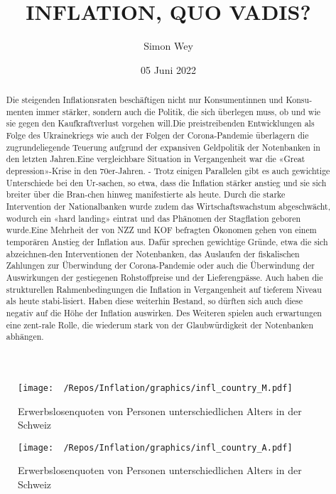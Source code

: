 \documentclass[
]{article}
\title{INFLATION, QUO VADIS?}
\author{Simon Wey}
\date{05 Juni 2022}
\begin{document}
\maketitle
\begin{abstract}
Die steigenden Inflationsraten beschäftigen nicht nur Konsumentinnen und
Konsu-menten immer stärker, sondern auch die Politik, die sich überlegen
muss, ob und wie sie gegen den Kaufkraftverlust vorgehen will.Die
preistreibenden Entwicklungen als Folge des Ukrainekriegs wie auch der
Folgen der Corona-Pandemie überlagern die zugrundeliegende Teuerung
aufgrund der expansiven Geldpolitik der Notenbanken in den letzten
Jahren.Eine vergleichbare Situation in Vergangenheit war die «Great
depression»-Krise in den 70er-Jahren. - Trotz einigen Parallelen gibt es
auch gewichtige Unterschiede bei den Ur-sachen, so etwa, dass die
Inflation stärker anstieg und sie sich breiter über die Bran-chen hinweg
manifestierte als heute. Durch die starke Intervention der
Nationalbanken wurde zudem das Wirtschaftswachstum abgeschwächt, wodurch
ein «hard landing» eintrat und das Phänomen der Stagflation geboren
wurde.Eine Mehrheit der von NZZ und KOF befragten Ökonomen gehen von
einem temporären Anstieg der Inflation aus. Dafür sprechen gewichtige
Gründe, etwa die sich abzeichnen-den Interventionen der Notenbanken, das
Auslaufen der fiskalischen Zahlungen zur Überwindung der Corona-Pandemie
oder auch die Überwindung der Auswirkungen der gestiegenen
Rohstoffpreise und der Lieferengpässe. Auch haben die strukturellen
Rahmenbedingungen die Inflation in Vergangenheit auf tieferem Niveau als
heute stabi-lisiert. Haben diese weiterhin Bestand, so dürften sich auch
diese negativ auf die Höhe der Inflation auswirken. Des Weiteren spielen
auch erwartungen eine zent-rale Rolle, die wiederum stark von der
Glaubwürdigkeit der Notenbanken abhängen.
\end{abstract}

\renewcommand{\figurename}{Abbildung}

\begin{figure} \centering
\texttt{[image: ~/Repos/Inflation/graphics/infl\_country\_M.pdf]}
\caption{Erwerbslosenquoten von Personen unterschiedlichen Alters in der Schweiz}
\label{Inf_M}
\end{figure}

\begin{figure} \centering
\texttt{[image: ~/Repos/Inflation/graphics/infl\_country\_A.pdf]}
\caption{Erwerbslosenquoten von Personen unterschiedlichen Alters in der Schweiz}
\label{Inf_A}
\end{figure}
\end{document}
